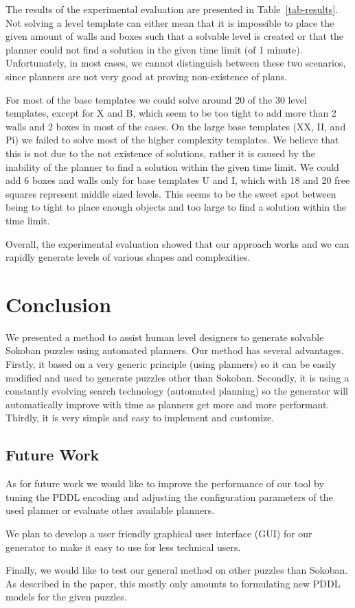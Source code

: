 \documentclass[runningheads]{llncs}
\begin{document}
The results of the experimental evaluation are presented in Table~\ref{tab-results}.
Not solving a level template can either mean that it is impossible to place the given amount of walls
and boxes such that a solvable level is created or that the planner could not find a solution in the given
time limit (of 1 minute). Unfortunately, in most cases, we cannot distinguish between these two scenarios,
since planners are not very good at proving non-existence of plans.

For most of the base templates we could solve around 20 of the 30 level templates, except for X and B,
which seem to be too tight to add more than 2 walls and 2 boxes in most of the cases.
On the large base templates (XX, II, and Pi) we failed to solve most of the higher complexity templates. We
believe that this is not due to the not existence of solutions, rather it is caused by the inability of
the planner to find a solution within the given time limit.
We could add 6 boxes and walls only for base templates U and I, which with 18 and 20 free squares
represent middle sized levels. This seems to be the sweet spot between being to tight to place
enough objects and too large to find a solution within the time limit.

Overall, the experimental evaluation showed that our approach works and we can rapidly
generate levels of various shapes and complexities. 

\section{Conclusion}
We presented a method to assist human level designers to generate solvable Sokoban
puzzles using automated planners. Our method has several advantages. Firstly,
it based on a very generic principle (using planners) so it can be easily modified and used
to generate puzzles other than Sokoban. Secondly, it is using a constantly
evolving search technology (automated planning) so the generator will automatically
improve with time as planners get more and more performant. Thirdly, it is very simple
and easy to implement and customize.

\subsection{Future Work}
As for future work we would like to improve the performance of our tool by tuning the PDDL
encoding and adjusting the configuration parameters of the used planner or evaluate
other available planners.

We plan to develop a user friendly graphical user interface (GUI) for our generator
to make it easy to use for less technical users.

Finally, we would like to test our general method on other puzzles than Sokoban. As described in
the paper, this mostly only amounts to formulating new PDDL models for the given puzzles.

%
%
%


%
\end{document}
